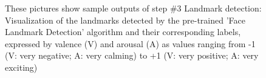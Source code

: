 \begin{figure}[htbp]
  \hfill
  \caption[ER pipeline step \#3: Landmark detection]{These pictures show sample outputs of step \#3 Landmark detection: Visualization of the landmarks detected by the pre-trained 'Face Landmark Detection' algorithm \citep{Kazemi:2014:ShapePredictor} and their corresponding labels, expressed by valence (V) and arousal (A) as values ranging from -1 (V: very negative; A: very calming) to +1 (V: very positive; A: very exciting)}
  \label{fig:MethodologyLandmarks}
\end{figure}

